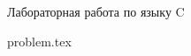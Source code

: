 \documentclass [11pt, a4paper, oneside] {article}
\begin{document}
 
 \contest
 {Лабораторная работа по языку C}%
 {}%
 {}%
 
 
 \renewcommand{\t}{\texttt}
 
 {problem.tex}
 
 
\end{document}
